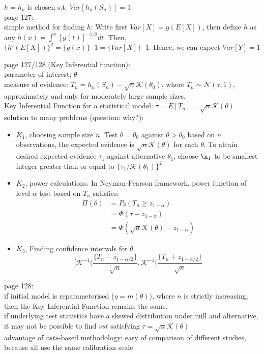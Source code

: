 $h=h_n$ is chosen s.t. $Var[h_n(S_n)]=1$\\

page 127:\\
simple method for finding $h$: Write first $Var[X]=g(E[X])$, then define $h$ as any $h(x)=\int^x [g(t)]^{-1/2} dt$. Then, $\{h'(E[X])\}^2 = \{g(x)\}^-1=\{Var[X]\}^-1$. Hence, we can expect $Var[Y]=1$

page 127/128 (Key Inferential function):\\
parameter of interest: $\theta$\\
measure of evidence: $T_n = h_n(S_n)-\sqrt{n}\mathcal{K}(\theta_0)$, where $T_n \sim \mathcal{N}(\tau,1)$, approximately and only for moderately large sample sizes.\\
Key Inferential Function for a statistical model: $\tau = E[T_n]=\sqrt{n}\mathcal{K}(\theta)$\\

solution to many problems (question: why?):
\begin{itemize}
    \item $K_1$, choosing sample size $n$. Test $\theta=\theta_0$ against $\theta > \theta_0$ based on $n$ observations, the expected evidence is $\sqrt{n}\mathcal{K}(\theta)$ for each $\theta$. To attain desired expected evidence $\tau_1$ against alternative $\theta_1$, choose $\n_1$ to be smallest integer greater than or equal to $\{\tau_1/\mathcal{K}(\theta_1)\}^2$
    \item $K_2$, power calculations. In Neyman-Pearson framework, power function of level $\alpha$ test based on $T_n$ satisfies:
    \begin{align*}
        \Pi(\theta) &= P_{\theta}(T_n \geq z_{1-\alpha})\\
                    &= \Phi(\tau-z_{1-\alpha})\\
                    &= \Phi(\sqrt{n}\mathcal{K}(\theta)-z_{1-\alpha})
    \end{align*}
    \item $K_3$, Finding confidence intervals for $\theta$. 
    $$[\mathcal{K}^{-1}(\frac{\{T_n-z_{1-\alpha/2}\}}{\sqrt{n}},\mathcal{K}^{-1}(\frac{\{T_n+z_{1-\alpha/2}\}}{\sqrt{n}}$$
\end{itemize}

page 128:\\
if initial model is reparameterised ($\eta = m(\theta)$), where $n$ is strictly increasing, then the Key Inferential Function remains the same.\\
if underlying test statistics have a skewed distribution under null and alternative, it may not be possible to find $vst$ satisfying $\tau = \sqrt{n}\mathcal{K}(\theta)$\\
advantage of $vsts$-based methodology: easy of comparison of different studies, because all use the same calibration scale\\

